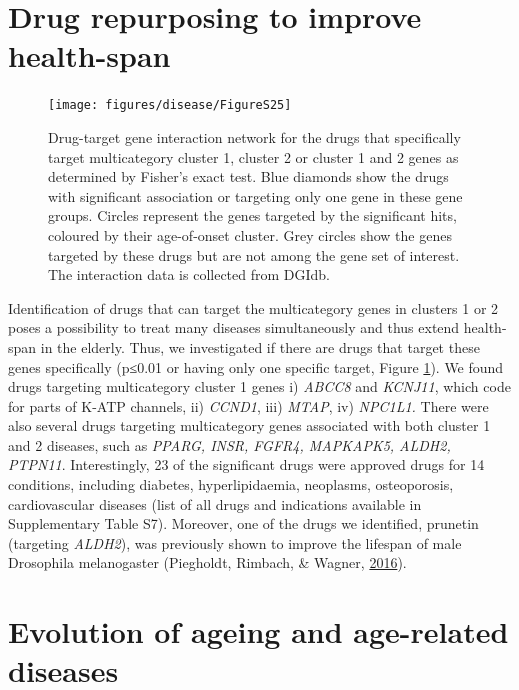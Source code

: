\documentclass[12pt,twoside]{unicam}
\begin{document}
\hypertarget{drug-repurposing-to-improve-health-span}{%
\section{Drug repurposing to improve health-span}\label{drug-repurposing-to-improve-health-span}}

\begin{figure}

{\centering \texttt{[image: figures/disease/FigureS25]} 

}

\caption[Drug-target gene interaction network for the drugs specific to multicategory age-dependent diseases.]{Drug-target gene interaction network for the drugs that specifically target multicategory cluster 1, cluster 2 or cluster 1 and 2 genes as determined by Fisher's exact test. Blue diamonds show the drugs with significant association or targeting only one gene in these gene groups. Circles represent the genes targeted by the significant hits, coloured by their age-of-onset cluster. Grey circles show the genes targeted by these drugs but are not among the gene set of interest. The interaction data is collected from DGIdb.}\label{fig:disFigS25}
\end{figure}

Identification of drugs that can target the multicategory genes in clusters 1 or 2 poses a possibility to treat many diseases simultaneously and thus extend health-span in the elderly. Thus, we investigated if there are drugs that target these genes specifically (p≤0.01 or having only one specific target, Figure \ref{fig:disFigS25}). We found drugs targeting multicategory cluster 1 genes i) \emph{ABCC8} and \emph{KCNJ11}, which code for parts of K-ATP channels, ii) \emph{CCND1}, iii) \emph{MTAP}, iv) \emph{NPC1L1.} There were also several drugs targeting multicategory genes associated with both cluster 1 and 2 diseases, such as \emph{PPARG, INSR, FGFR4, MAPKAPK5, ALDH2, PTPN11}. Interestingly, 23 of the significant drugs were approved drugs for 14 conditions, including diabetes, hyperlipidaemia, neoplasms, osteoporosis, cardiovascular diseases (list of all drugs and indications available in Supplementary Table S7). Moreover, one of the drugs we identified, prunetin (targeting \emph{ALDH2}), was previously shown to improve the lifespan of male Drosophila melanogaster (Piegholdt, Rimbach, \& Wagner, \protect\hyperlink{ref-Piegholdt2016}{2016}).

\hypertarget{evolution-of-ageing-and-age-related-diseases}{%
\section{Evolution of ageing and age-related diseases}\label{evolution-of-ageing-and-age-related-diseases}}
\end{document}
